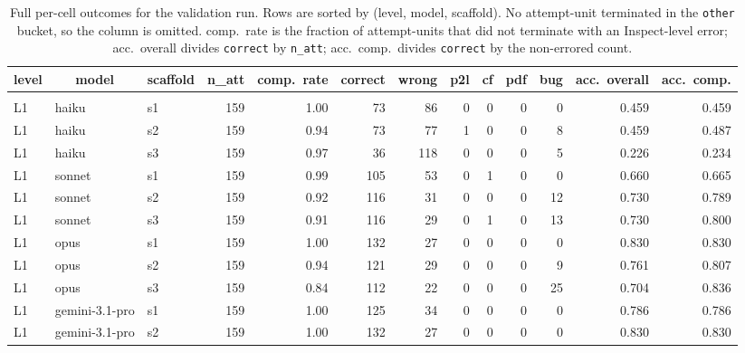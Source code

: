 \documentclass[10pt]{article} %
\begin{document}
    \begin{table}[t]
        \caption{Full per-cell outcomes for the validation run. Rows are sorted by (level, model, scaffold). No attempt-unit terminated in the \texttt{other} bucket, so the column is omitted. comp.\ rate is the fraction of attempt-units that did not terminate with an Inspect-level error; acc.\ overall divides \texttt{correct} by \texttt{n\_att}; acc.\ comp.\ divides \texttt{correct} by the non-errored count.}
    \label{tab:per_cell_outcomes_full}
    \begin{center}
    \footnotesize \setlength{\tabcolsep}{3pt}
    \begin{tabular}{lllrrrrrrrrrr}
    \multicolumn{1}{c}{\bf level} & \multicolumn{1}{c}{\bf model} & \multicolumn{1}{c}{\bf scaffold} & \multicolumn{1}{c}{\bf n\_att} & \multicolumn{1}{c}{\bf comp.\ rate} & \multicolumn{1}{c}{\bf correct} & \multicolumn{1}{c}{\bf wrong} & \multicolumn{1}{c}{\bf p2l} & \multicolumn{1}{c}{\bf cf} & \multicolumn{1}{c}{\bf pdf} & \multicolumn{1}{c}{\bf bug} & \multicolumn{1}{c}{\bf acc.\ overall} & \multicolumn{1}{c}{\bf acc.\ comp.} \\
        \hline \\
        L1 & haiku & s1 & 159 & 1.00 & 73 & 86 & 0 & 0 & 0 & 0 & 0.459 & 0.459 \\
        L1 & haiku & s2 & 159 & 0.94 & 73 & 77 & 1 & 0 & 0 & 8 & 0.459 & 0.487 \\
        L1 & haiku & s3 & 159 & 0.97 & 36 & 118 & 0 & 0 & 0 & 5 & 0.226 & 0.234 \\
        L1 & sonnet & s1 & 159 & 0.99 & 105 & 53 & 0 & 1 & 0 & 0 & 0.660 & 0.665 \\
        L1 & sonnet & s2 & 159 & 0.92 & 116 & 31 & 0 & 0 & 0 & 12 & 0.730 & 0.789 \\
        L1 & sonnet & s3 & 159 & 0.91 & 116 & 29 & 0 & 1 & 0 & 13 & 0.730 & 0.800 \\
        L1 & opus & s1 & 159 & 1.00 & 132 & 27 & 0 & 0 & 0 & 0 & 0.830 & 0.830 \\
        L1 & opus & s2 & 159 & 0.94 & 121 & 29 & 0 & 0 & 0 & 9 & 0.761 & 0.807 \\
        L1 & opus & s3 & 159 & 0.84 & 112 & 22 & 0 & 0 & 0 & 25 & 0.704 & 0.836 \\
        L1 & gemini-3.1-pro & s1 & 159 & 1.00 & 125 & 34 & 0 & 0 & 0 & 0 & 0.786 & 0.786 \\
        L1 & gemini-3.1-pro & s2 & 159 & 1.00 & 132 & 27 & 0 & 0 & 0 & 0 & 0.830 & 0.830 \\

\end{tabular}
\end{center}
\end{table}
\end{document}
